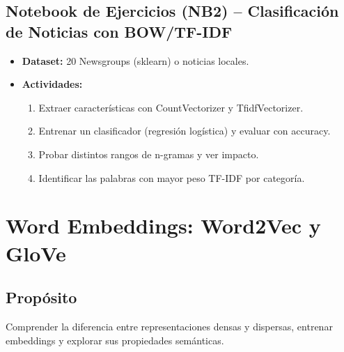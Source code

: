 \documentclass[12pt,a4paper]{article}
\begin{document}
\subsection*{Notebook de Ejercicios (NB2) – Clasificación de Noticias con BOW/TF-IDF}
\begin{itemize}
    \item \textbf{Dataset:} 20 Newsgroups (sklearn) o noticias locales.
    \item \textbf{Actividades:}
    \begin{enumerate}
        \item Extraer características con CountVectorizer y TfidfVectorizer.
        \item Entrenar un clasificador (regresión logística) y evaluar con accuracy.
        \item Probar distintos rangos de n-gramas y ver impacto.
        \item Identificar las palabras con mayor peso TF-IDF por categoría.
    \end{enumerate}
\end{itemize}

\section{Word Embeddings: Word2Vec y GloVe}
\subsection*{Propósito}
Comprender la diferencia entre representaciones densas y dispersas, entrenar embeddings y explorar sus propiedades semánticas.
\end{document}
